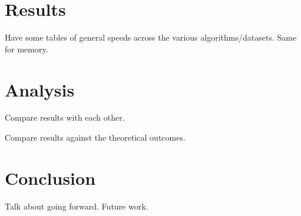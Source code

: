 \documentclass{article}
\begin{document}

\section{Results}
Have some tables of general speeds across the various algorithms/datasets. Same for memory.

\section{Analysis}
Compare results with each other.

Compare results against the theoretical outcomes.

\section{Conclusion}
Talk about going forward. Future work.
\nocite{*}




\end{document}
